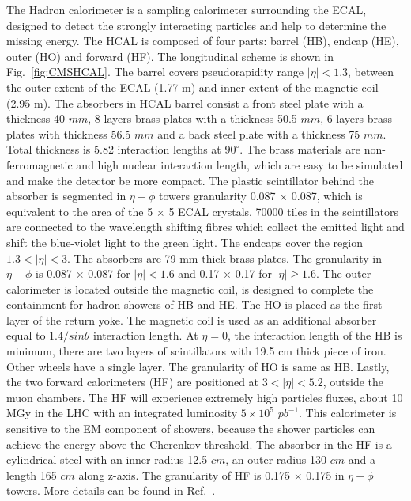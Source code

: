 The Hadron calorimeter is a sampling calorimeter surrounding the ECAL, designed to detect the strongly interacting particles and help to determine the missing energy.
The HCAL is composed of four parts: barrel (HB), endcap (HE), outer (HO) and forward (HF). The longitudinal scheme is shown in Fig.~\ref{fig:CMSHCAL}.
The barrel covers pseudorapidity range $\vert\eta\vert < 1.3$, between the outer extent of the ECAL (1.77 m) and inner extent of the magnetic coil (2.95 m). 
The absorbers in HCAL barrel consist a front steel plate with a thickness 40 $mm$, 8 layers brass plates with a thickness 50.5 $mm$, 6 layers brass plates with thickness 56.5 $mm$ and a back steel plate with a thickness 75 $mm$. Total thickness is 5.82 interaction lengths at $90^{\circ}$.
The brass materials are non-ferromagnetic and high nuclear interaction length, which are easy to be simulated and make the detector be more compact.
The plastic scintillator behind the absorber is segmented in $\eta-\phi$ towers granularity 0.087 $\times$ 0.087, which is equivalent to the area of the 5 $\times$ 5 ECAL crystals.
70000 tiles in the scintillators are connected to the wavelength shifting fibres which collect the emitted light and shift the blue-violet light to the green light.
The endcaps cover the region $1.3 < \vert\eta\vert < 3$. The absorbers are 79-mm-thick brass plates.
The granularity in $\eta-\phi$ is 0.087 $\times$ 0.087 for $\vert\eta\vert < 1.6$ and 0.17 $\times$ 0.17 for $\vert\eta\vert \geq 1.6$.
The outer calorimeter is located outside the magnetic coil, is designed to complete the containment for hadron showers of HB and HE.
The HO is placed as the first layer of the return yoke.
The magnetic coil is used as an additional absorber equal to $1.4/sin\theta$ interaction length.
At $\eta = 0$, the interaction length of the HB is minimum, there are two layers of scintillators with 19.5 cm thick piece of iron.
Other wheels have a single layer. The granularity of HO is same as HB.
Lastly, the two forward calorimeters (HF) are positioned at $3 < \vert\eta\vert < 5.2$, outside the muon chambers.
The HF will experience extremely high particles fluxes, about 10 MGy in the LHC with an integrated luminosity $5 \times 10^{5}$ $pb^{-1}$.
This calorimeter is sensitive to the EM component of showers, because the shower particles can achieve the energy above the Cherenkov threshold.
The absorber in the HF is a cylindrical steel with an inner radius 12.5 $cm$, an outer radius 130 $cm$ and a length 165 $cm$ along z-axis.
The granularity of HF is 0.175 $\times$ 0.175 in $\eta-\phi$ towers.
More details can be found in Ref.~\cite{CMS:HCALTDR}.

